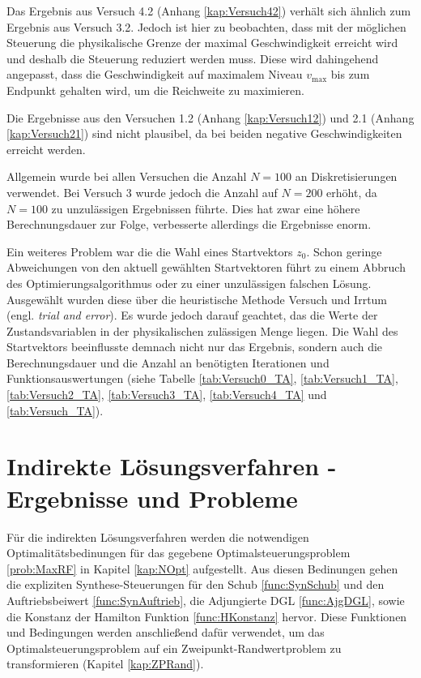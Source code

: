 Das Ergebnis aus Versuch 4.2 (Anhang \ref{kap:Versuch42}) verhält sich ähnlich zum Ergebnis aus Versuch 3.2. Jedoch ist hier zu beobachten, dass mit der möglichen Steuerung die physikalische Grenze der maximal Geschwindigkeit erreicht wird und deshalb die Steuerung reduziert werden muss. Diese wird dahingehend angepasst, dass die Geschwindigkeit auf maximalem Niveau $v_{\max}$ bis zum Endpunkt gehalten wird, um die Reichweite zu maximieren.

Die Ergebnisse aus den Versuchen 1.2 (Anhang \ref{kap:Versuch12}) und 2.1 (Anhang \ref{kap:Versuch21}) sind nicht plausibel, da bei beiden negative Geschwindigkeiten erreicht werden.

Allgemein wurde bei allen Versuchen die Anzahl $N = 100$ an Diskretisierungen verwendet. Bei Versuch 3 wurde jedoch die Anzahl auf $N = 200$ erhöht, da $N=100$ zu unzulässigen Ergebnissen führte. Dies hat zwar eine höhere Berechnungsdauer zur Folge, verbesserte allerdings die Ergebnisse enorm.

Ein weiteres Problem war die die Wahl eines Startvektors $z_0$. Schon geringe Abweichungen von den aktuell gewählten Startvektoren führt zu einem Abbruch des Optimierungsalgorithmus oder zu einer unzulässigen falschen Lösung. Ausgewählt wurden diese über die heuristische Methode \glqq Versuch und Irrtum\grqq{} (engl. \textit{trial and error}). Es wurde jedoch darauf geachtet, das die Werte der Zustandsvariablen in der physikalischen zulässigen Menge liegen. Die Wahl des Startvektors beeinflusste demnach nicht nur das Ergebnis, sondern auch die Berechnungsdauer und die Anzahl an benötigten Iterationen und Funktionsauswertungen (siehe Tabelle \ref{tab:Versuch0_TA}, \ref{tab:Versuch1_TA}, \ref{tab:Versuch2_TA}, \ref{tab:Versuch3_TA}, \ref{tab:Versuch4_TA} und \ref{tab:Versuch_TA}).








\section{Indirekte Lösungsverfahren - Ergebnisse und Probleme}\label{kap:LSGIndirekt}
Für die indirekten Lösungsverfahren werden die notwendigen Optimalitätsbedinungen für das gegebene Optimalsteuerungsproblem \ref{prob:MaxRF} in Kapitel \ref{kap:NOpt} aufgestellt. Aus diesen Bedinungen gehen die expliziten Synthese-Steuerungen für den Schub \ref{func:SynSchub} und den Auftriebsbeiwert \ref{func:SynAuftrieb}, die Adjungierte DGL \ref{func:AjgDGL}, sowie die Konstanz der Hamilton Funktion \ref{func:HKonstanz} hervor. Diese Funktionen und Bedingungen werden anschließend dafür verwendet, um das Optimalsteuerungsproblem auf ein Zweipunkt-Randwertproblem zu transformieren (Kapitel \ref{kap:ZPRand}).

